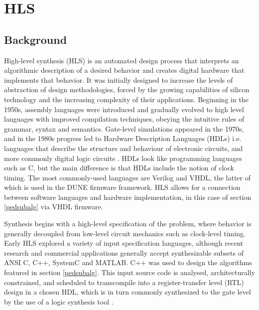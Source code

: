 \documentclass[10pt]{article}
\begin{document}
\section{HLS}\label{HLS_section}

\subsection{Background}
High-level synthesis (HLS) is an automated design process that interprets an algorithmic description of a desired behavior and creates digital hardware that implements that behavior. It was initially designed to increase the levels of abstraction of design methodologies, forced by the growing capabilities of silicon technology and the increasing complexity of their applications. Beginning in the 1950s, assembly languages were introduced and gradually evolved to high level languages with improved compilation techniques, obeying the intuitive rules of grammar, syntax and semantics. Gate-level simulations appeared in the 1970s, and in the 1980s progress led to Hardware Description Languages (HDLs)  i.e. languages that describe the structure and behaviour of electronic circuits, and more commonly digital logic circuits \cite{coussy2009introduction}. HDLs look like programming languages such as C, but the main difference is that HDLs include the notion of clock timing. The most commonly-used languages are Verilog and VHDL, the latter of which is used in the DUNE firmware framework. HLS allows for a connection between software languages and hardware implementation, in this case of section \ref{pedsubalg} via VHDL firmware. 

Synthesis begins with a high-level specification of the problem, where behavior is generally decoupled from low-level circuit mechanics such as clock-level timing. Early HLS explored a variety of input specification languages, although recent research and commercial applications generally accept synthesizable subsets of ANSI C, C++, SystemC and MATLAB. C++ was used to design the algorithms featured in section \ref{pedsubalg}. This input source code is analysed, architecturally constrained, and scheduled to transcompile into a register-transfer level (RTL) design in a chosen HDL, which is in turn commonly synthesized to the gate level by the use of a logic synthesis tool \cite{vivado_design_suite_user_guide_2018}.
\end{document}
